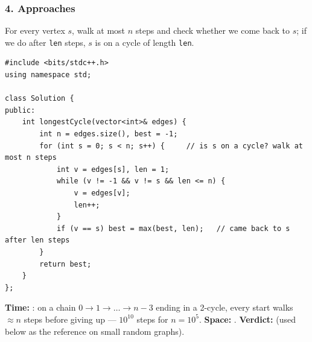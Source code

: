 \subsubsection*{4. Approaches}

\begin{bruteforcebox}
For every vertex $s$, walk at most $n$ steps and check whether we come back to $s$; if we do after \texttt{len} steps, $s$ is on a cycle of length \texttt{len}.

\begin{lstlisting}[style=cpp]
#include <bits/stdc++.h>
using namespace std;

class Solution {
public:
    int longestCycle(vector<int>& edges) {
        int n = edges.size(), best = -1;
        for (int s = 0; s < n; s++) {     // is s on a cycle? walk at most n steps
            int v = edges[s], len = 1;
            while (v != -1 && v != s && len <= n) {
                v = edges[v];
                len++;
            }
            if (v == s) best = max(best, len);   // came back to s after len steps
        }
        return best;
    }
};
\end{lstlisting}

\begin{complexitybox}
\begin{diagrambox}
\end{diagrambox}

\textbf{Time:} : on a chain $0 \to 1 \to \dots \to n{-}3$ ending in a 2-cycle, every start walks $\approx n$ steps before giving up --- $10^{10}$ steps for $n = 10^5$. \textbf{Space:} . \textbf{Verdict:} \tle{} (used below as the reference on small random graphs).
\end{complexitybox}
\end{bruteforcebox}

